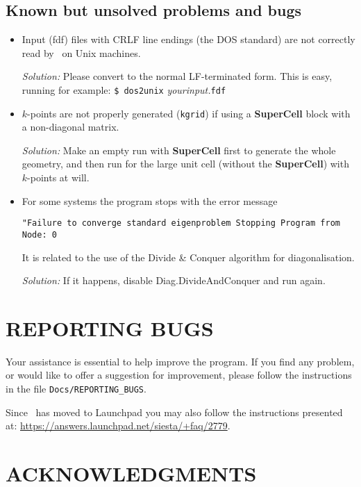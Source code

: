 \subsection{Known but unsolved problems and bugs}

\begin{itemize}

\item
Input (fdf) files with CRLF line endings (the DOS standard) are not
correctly read by \siesta\ on Unix machines.

\textit{Solution:} Please convert to the normal LF-terminated form. This
is easy, running for example: \texttt{\$ dos2unix} \textit{yourinput.}\texttt{fdf}

\item
$k$-points are not properly generated (\texttt{kgrid}) if using a
\textbf{SuperCell} block with a non-diagonal matrix.

\textit{Solution:} Make an empty run with \textbf{SuperCell} first to generate
the whole geometry, and then run for the large unit cell (without the
\textbf{SuperCell}) with $k$-points at will.

\item
For some systems the program stops with the error message

\texttt{"Failure to converge standard eigenproblem
Stopping Program from Node:    0}

It is related to the use of the Divide \& Conquer algorithm for
diagonalisation.

\textit{Solution:} If it happens, disable Diag.DivideAndConquer and run again.

\end{itemize}


\section{REPORTING BUGS}

Your assistance is essential to help improve the program. If you find
any problem, or would like to offer a suggestion for improvement,
please follow the instructions in the file
\texttt{Docs/REPORTING\_BUGS}. 

Since \siesta\ has moved to Launchpad you may also follow the
instructions presented at:
\url{https://answers.launchpad.net/siesta/+faq/2779}. 



\section{ACKNOWLEDGMENTS}


